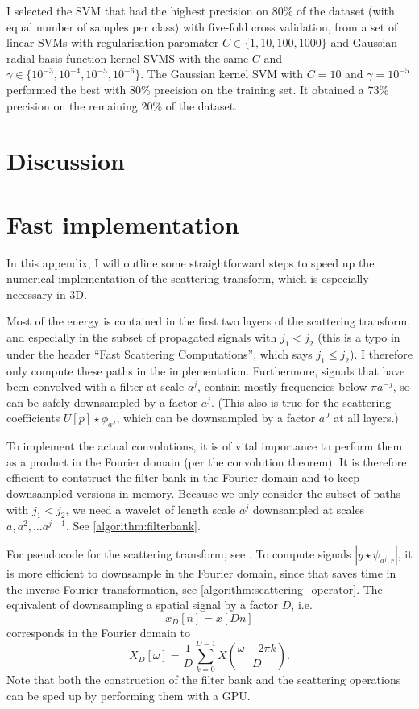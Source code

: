 \documentclass[twocolumn, openany, oneside, article]{memoir}
\begin{document}
I selected the SVM that had the highest precision on 80\% of the dataset (with
equal number of samples per class) with five-fold cross validation, from a set of linear SVMs with
regularisation paramater $C \in \{1, 10, 100, 1000\}$ and Gaussian radial basis function kernel SVMS with
the same $C$ and $\gamma \in \{ 10^{-3}, 10^{-4}, 10^{-5}, 10^{-6} \}$. The Gaussian kernel SVM with $C = 10$ and $\gamma = 10^{-5}$
performed the best with 80\% precision on the training set. It obtained a 73\% precision on the remaining 20\% of the dataset.

\chapter{Discussion}


\appendix

\chapter{Fast implementation}

In this appendix, I will outline some straightforward steps to speed up the
numerical implementation of the scattering transform, which is especially
necessary in 3D.

Most of the energy is contained in the first two layers of the scattering
transform, and especially in the subset of propagated signals with $j_1 < j_2$
\cite{bruna2013invariant, mallat2012group} (this is a typo in \cite{bruna2013}
under the header \enquote{Fast Scattering Computations}, which says $j_1 \leq
j_2$). I therefore only compute these paths in the implementation.
Furthermore, signals that have been convolved with a filter at scale $a^j$,
contain mostly frequencies below $\pi a^{-j}$, so can be safely downsampled by a factor $a^j$.
(This also is true for the scattering coefficients $U[p] \star \phi_{a^J}$, which can be downsampled by a factor
$a^J$ at all layers.)

To implement the actual convolutions, it is of vital importance to perform them
as a product in the Fourier domain (per the convolution theorem). It is therefore efficient to contstruct
the filter bank in the Fourier domain and to keep downsampled versions in memory. Because we only
consider the subset of paths with $j_1 < j_2$, we need a wavelet of length scale $a^j$ downsampled at
scales $a, a^{2}, \dots a^{j-1}$. See \autoref{algorithm:filterbank}.

For pseudocode for the scattering transform, see \cite{bruna2013invariant}.
To compute signals $|y \star \psi_{a^j, r}|$, it is more efficient to downsample in the Fourier domain,
since that saves time in the inverse Fourier transformation, see \autoref{algorithm:scattering_operator}.
The equivalent of downsampling a spatial signal by a factor $D$, i.e.
\begin{equation}
  x_D[n] = x[Dn]
\end{equation}
corresponds in the Fourier domain to
\begin{equation}
  X_D[\omega] = \frac{1}{D}\sum_{k=0}^{D-1}X(\frac{\omega - 2 \pi k}{D}).
\end{equation}
Note that both the construction of the filter bank and the scattering operations can be sped up
by performing them with a GPU.
\end{document}
